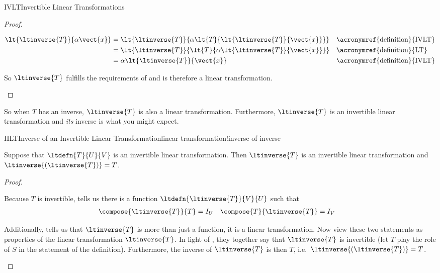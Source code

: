 \begin{subsect}{IVLT}{Invertible Linear Transformations}
\begin{proof}
\begin{para}
%
\begin{align*}
%
\lt{\ltinverse{T}}{\alpha\vect{x}}&=
\lt{\ltinverse{T}}{\alpha\lt{T}{\lt{\ltinverse{T}}{\vect{x}}}}
&&\text{\acronymref{definition}{IVLT}}\\
%
&=\lt{\ltinverse{T}}{\lt{T}{\alpha\lt{\ltinverse{T}}{\vect{x}}}}
&&\text{\acronymref{definition}{LT}}\\
%
&=\alpha\lt{\ltinverse{T}}{\vect{x}}
&&\text{\acronymref{definition}{IVLT}}
%
\end{align*}
\end{para}
%
\begin{para}So $\ltinverse{T}$ fulfills the requirements of  and is therefore a linear transformation.\end{para}
%
\end{proof}
%
\begin{para}So when $T$ has an inverse, $\ltinverse{T}$ is also a linear transformation.  Furthermore, $\ltinverse{T}$ is an invertible linear transformation and {\em its} inverse is what you might expect.\end{para}
%
%
\begin{theorem}{IILT}{Inverse of an Invertible Linear Transformation}{linear transformation!inverse of inverse}
\begin{para}Suppose that $\ltdefn{T}{U}{V}$ is an invertible linear transformation.  Then $\ltinverse{T}$ is an invertible linear transformation and $\ltinverse{\left(\ltinverse{T}\right)}=T$.\end{para}
\end{theorem}
%
\begin{proof}
\begin{para}Because $T$ is invertible,  tells us there is a function $\ltdefn{\ltinverse{T}}{V}{U}$ such that
%
\begin{align*}
\compose{\ltinverse{T}}{T}&=I_U & \compose{T}{\ltinverse{T}}&=I_V
\end{align*}
\end{para}
%
\begin{para}Additionally,  tells us that $\ltinverse{T}$ is more than just a function, it is a linear transformation.  Now view these two statements as properties of the linear transformation $\ltinverse{T}$.  In light of , they together say that $\ltinverse{T}$ is invertible (let $T$ play the role of $S$ in the statement of the definition).  Furthermore, the inverse of $\ltinverse{T}$ is then $T$, i.e.\ $\ltinverse{\left(\ltinverse{T}\right)}=T$.\end{para}
\end{proof}
%
%
\end{subsect}
